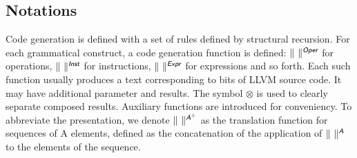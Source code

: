\documentclass{llncs}
\newcommand{\trad}[2]{\ensuremath{\lVert \textsf{#1} \rVert^{\textit{#2}}}}
\newcommand{\B}[1]{\textsf{#1}}
\newcommand{\ListOf}[1]{$\mbox{#1}^+$}
\newcommand{\sep}[0]{\otimes}
\begin{document}
\begin{enumerate}
\section{Notations} 
\label{sec:notation}

Code generation is defined with a set of rules defined by
structural recursion. For each grammatical construct, a code generation function
is defined: $\trad{~}{\B{Oper}}$ for operations, $\trad{~}{\B{Inst}}$ for
instructions, $\trad{~}{\B{Expr}}$ for expressions and so forth. Each such
function usually produces a text corresponding to bits of LLVM source code. It
may have additional parameter and results. The symbol $\sep$ is used to clearly
separate composed results. Auxiliary functions are introduced for
conveniency. To abbreviate the presentation, we denote
$\trad{~}{\ListOf{\B{A}}}$ as the translation function for sequences of \B{A}
elements, defined as the concatenation of the application of $\trad{~}{\B{A}}$
to the elements of the sequence.


\end{enumerate}
\end{document}
